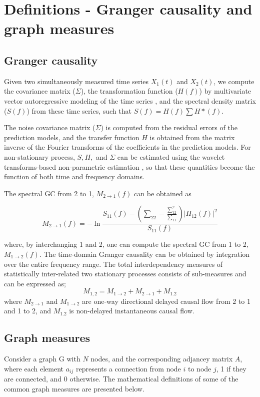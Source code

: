 \chapter{Definitions - Granger causality and graph measures}
\label{chapter:appendix-definitions}

\section{Granger causality}
Given two simultaneously measured time series $X_{1}(t)$ and $X_{2}(t)$, we compute the covariance matrix ($\Sigma$), the transformation function ($H(f)$) by multivariate vector autoregressive modeling of the time series \citep{dhamala2008analyzing, dhamala2008estimating}, and the spectral density matrix ($S(f)$) from these time series, such that $S(f) = H(f) \sum H*(f)$. 

The noise covariance matrix ($\Sigma$) is computed from the residual errors of the prediction models, and the transfer function $H$ is obtained from the matrix inverse of the Fourier transforms of the coefficients in the prediction models. For non-stationary process, $S, H,$ and $\Sigma$ can be estimated using the wavelet transforms-based non-parametric estimation \citep{dhamala2008estimating}, so that these quantities become the function of both time and frequency domains.

The spectral GC from 2 to 1, $M_{2 \rightarrow 1}(f)$ can be obtained as

\[ M_{2\rightarrow1}(f) = -\ln \frac{S_{11}(f) - (\sum_{22}- \frac{\sum^2_{12}}{\sum_{11}} ) | H_{12}(f) |^2 }{S_{11}(f)}\] 

where, by interchanging 1 and 2, one can compute the spectral GC from 1 to 2, $M_{1 \rightarrow 2}(f)$.
The time-domain Granger causality can be obtained by integration over the entire frequency range.
The total interdependency measures of statistically inter-related two stationary
processes consists of sub-measures and can be expressed as;
\[ M_{1,2} = M_{1 \rightarrow 2} + M_{2 \rightarrow 1} + M_{1.2} \]
where $M_{2 \rightarrow 1}$ and $M_{1 \rightarrow 2}$ are one-way directional delayed causal flow from 2 to 1 and 1 to 2, and
$M_{1.2}$ is non-delayed instantaneous causal flow.

\section{Graph measures}
Consider a graph G with $N$ nodes, and the corresponding adjancey matrix $A$, where each element $a_{ij}$ represents a connection from node $i$ to node $j$, 1 if they are connected, and 0 otherwise. The mathematical definitions of some of the common graph measures are presented below.

